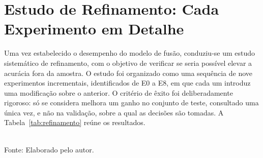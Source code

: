 \section{Estudo de Refinamento: Cada Experimento em Detalhe}

Uma vez estabelecido o desempenho do modelo de fusão, conduziu-se um estudo sistemático de refinamento, com o objetivo de verificar se seria possível elevar a acurácia fora da amostra. O estudo foi organizado como uma sequência de nove experimentos incrementais, identificados de E0 a E8, em que cada um introduz uma modificação sobre o anterior. O critério de êxito foi deliberadamente rigoroso: só se considera melhora um ganho no conjunto de teste, consultado uma única vez, e não na validação, sobre a qual as decisões são tomadas. A Tabela~\ref{tab:refinamento} reúne os resultados.

\begin{table}[htpb]
\centering
\caption{Resultados dos experimentos de refinamento, com a acurácia na validação, sobre a qual se tomam as decisões, e a acurácia no teste, único critério de êxito.}
\label{tab:refinamento}
\vspace{0.2cm}
{\small \\ Fonte: Elaborado pelo autor.}
\end{table}

